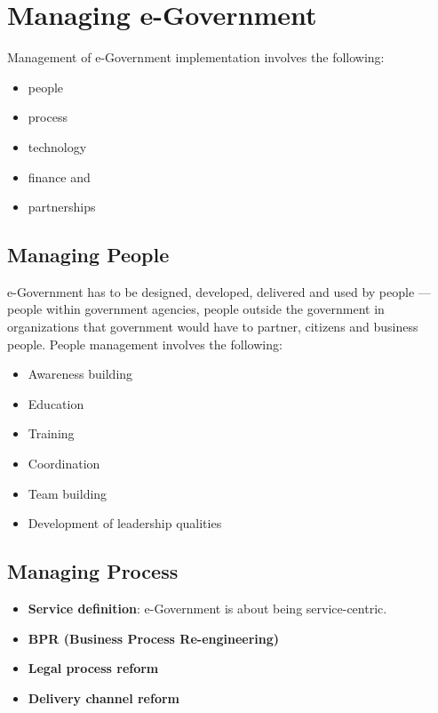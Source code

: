 \chapter{Managing e-Government}
Management of e-Government implementation involves the following:
\begin{multicols}{3}
	\begin{itemize}
		\item people
		\item process
		\item technology
		\item finance and
		\item partnerships
	\end{itemize}
\end{multicols}


\section*{Managing People}
e-Government has to be designed, developed, delivered and used by people --- people within government agencies, people outside the government in organizations that government would have to partner, citizens and business people. People management involves the following:

\begin{multicols}{2}
	\begin{itemize}
		\item Awareness building
		\item Education
		\item Training
		\item Coordination
		\item Team building
		\item Development of leadership qualities
	\end{itemize}
\end{multicols}


\section*{Managing Process}
\begin{itemize}
	\item \textbf{Service definition}: e-Government is about being service-centric.
	\item \textbf{BPR (Business Process Re-engineering)}
	\item \textbf{Legal process reform}
	\item \textbf{Delivery channel reform}
\end{itemize}


